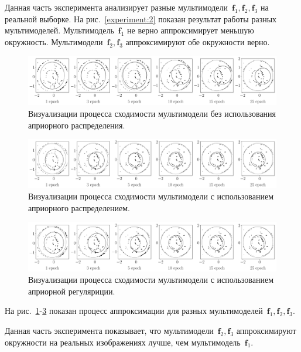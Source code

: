\documentclass[12pt, twoside]{article}
\numberwithin{equation}{section}
\begin{document}
Данная часть эксперимента анализирует разные мультимодели~$\textbf{f}_1, \textbf{f}_2, \textbf{f}_3$ на реальной выборке.
На рис.~\ref{experiment:2} показан результат работы разных мультимоделей.
Мультимодель~$\textbf{f}_1$  не верно аппроксимирует меньшую окружность.
Мультимодели~$\textbf{f}_2, \textbf{f}_3$ аппроксимируют обе окружности верно.

\begin{figure}[h!t]\center
\includegraphics[width=1\textwidth]{result_eng/experiment_real_not_prior}
\caption{Визуализации процесса сходимости мультимодели без использования априорного распределения.}
\label{experiment:3}
\end{figure}

\begin{figure}[h!t]\center
\includegraphics[width=1\textwidth]{result_eng/experiment_real_prior}
\caption{Визуализации процесса сходимости мультимодели с использованием априорного распределением.}
\label{experiment:4}
\end{figure}

\begin{figure}[h!t]\center
\includegraphics[width=1\textwidth]{result_eng/experiment_real_regular}
\caption{Визуализации процесса сходимости мультимодели с использованием априорной регуляриции.}
\label{experiment:5}
\end{figure}

На рис.~\ref{experiment:3}-\ref{experiment:5} показан процесс аппроксимации для разных мультимоделей~$\textbf{f}_1, \textbf{f}_2, \textbf{f}_3$.

Данная часть эксперимента показывает, что мультимодели~$\textbf{f}_2, \textbf{f}_3$ аппроксимируют окружности на реальных изображениях лучше, чем мультимодель~$\textbf{f}_1$.
\end{document}
